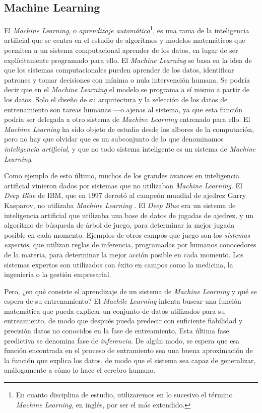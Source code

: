 \subsection{Machine Learning}

El \textit{Machine Learning}, o \textit{aprendizaje automático}\footnote{En cuanto disciplina de estudio, utilizaremos en lo sucesivo el término \textit{Machine Learning}, en inglés, por ser el más extendido.}, es una rama de la inteligencia artificial que se centra en el estudio de algoritmos y modelos matemáticos que permiten a un sistema computacional aprender de los datos, en lugar de ser explícitamente programado para ello. El \textit{Machine Learning} se basa en la idea de que los sistemas computacionales pueden aprender de los datos, identificar patrones y tomar decisiones con mínima o nula intervención humana. Se podría decir que en el \textit{Machine Learning} el modelo se programa a sí mismo a partir de los datos. Solo el diseño de su arquitectura y la selección de los datos de entrenamiento son tareas humanas ---o ajenas al sistema, ya que esta función podría ser delegada a otro sistema de \textit{Machine Learning} entrenado para ello. El \textit{Machine Learning} ha sido objeto de estudio desde los albores de la computación, pero no hay que olvidar que es un subconjunto de lo que denominamos \textit{inteligencia artificial}, y que no todo sistema inteligente es un sistema de \textit{Machine Learning}.

Como ejemplo de esto último, muchos de los grandes avances en inteligencia artificial vinieron dados por sistemas que no utilizaban \textit{Machine Learning}. El \textit{Deep Blue} de IBM, que en 1997 derrotó al campeón mundial de ajedrez Garry Kasparov, no utilizaba \textit{Machine Learning} \cite{campbellDeepBlue2002}. El \textit{Deep Blue} era un sistema de inteligencia artificial que utilizaba una base de datos de jugadas de ajedrez, y un algoritmo de búsqueda de árbol de juego, para determinar la mejor jugada posible en cada momento. Ejemplos de otros campos que juego son los \emph{sistemas expertos}, que utilizan reglas de inferencia, programadas por humanos conocedores de la materia, para determinar la mejor acción posible en cada momento. Los sistemas expertos son utilizados con éxito en campos como la medicina, la ingeniería o la gestión empresarial.

Pero, ¿en qué consiste el aprendizaje de un sistema de \textit{Machine Learning} y qué se espera de su entrenamiento? El \textit{Machile Learning} intenta buscar una función matemática que pueda explicar un conjunto de datos utilizados para su entreamiento, de modo que después pueda predecir con suficiente fiabilidad y precisión datos no conocidos en la fase de entreamiento. Esta última fase predictiva se denomina fase de \textit{inferencia}. De algún modo, se espera que esa función encontrada en el proceso de entramiento sea una buena aproximación de la función que explica los datos, de modo que el sistema sea capaz de generalizar, análogamente a cómo lo hace el cerebro humano.

